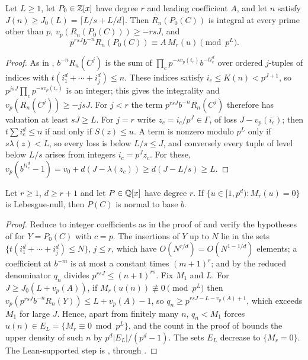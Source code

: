 \documentclass[11pt]{article}
\begin{document}
\begin{lemma}\label{lem:freezer}
Let $L\ge1$, let $P_0\in\mathbb Z[x]$ have degree $r$ and leading coefficient $A$, and let $n$ satisfy
$J(n)\ge J_0(L)=\lceil L/s+L/d\rceil$. Then $R_n(P_0(C))$ is integral at every prime other than $p$,
$v_p(R_n(P_0(C)))\ge-rsJ$, and
\[
p^{rsJ}b^{-n}R_n(P_0(C))\equiv A\,M_r(u)\pmod{p^L}.
\]
\end{lemma}

\begin{proof}
As in , $b^{-n}R_n(C^j)$ is the sum of $\prod_cp^{-sv_p(i_c)}b^{-ti_c^d}$ over ordered
$j$-tuples of indices with $t(i_1^d+\cdots+i_j^d)\le n$. These indices satisfy $i_c\le K(n)<p^{J+1}$, so
$p^{jsJ}\prod_cp^{-sv_p(i_c)}$ is an integer; this gives the integrality and $v_p(R_n(C^j))\ge-jsJ$. For
$j<r$ the term $p^{rsJ}b^{-n}R_n(C^j)$ therefore has valuation at least $sJ\ge L$. For $j=r$ write
$z_c=i_c/p^J\in\Gamma$, of loss $J-v_p(i_c)$; then $t\sum i_c^d\le n$ if and only if $S(z)\le u$. A term
is nonzero modulo $p^L$ only if $s\lambda(z)<L$, so every loss is below $L/s\le J$, and conversely every
tuple of level below $L/s$ arises from integers $i_c=p^Jz_c$. For these,
$v_p(b^{ti_c^d}-1)=v_0+d(J-\lambda(z_c))\ge d(J-L/s)\ge L$.
\end{proof}

\begin{lemma}\label{lem:reductionr}
Let $r\ge1$, $d\ge r+1$ and let $P\in\mathbb Q[x]$ have degree $r$. If $\{u\in[1,p^d):M_r(u)=0\}$ is
Lebesgue-null, then $P(C)$ is normal to base $b$.
\end{lemma}

\begin{proof}
Reduce to integer coefficients as in the proof of  and verify the hypotheses of
 for $Y=P_0(C)$ with $c=p$. The insertions of $Y$ up to $N$ lie in the sets
$\{t(i_1^d+\cdots+i_j^d)\le N\}$, $j\le r$, which have $O(N^{r/d})=O(N^{1-1/d})$ elements; a coefficient at
$b^{-m}$ is at most a constant times $(m+1)^r$; and by  the reduced denominator $q_n$
divides $p^{rsJ}\le(n+1)^{rs}$. Fix $M_1$ and $L$. For $J\ge J_0(L+v_p(A))$, if
$M_r(u(n))\not\equiv0\pmod{p^L}$ then $v_p(p^{rsJ}b^{-n}R_n(Y))\le L+v_p(A)-1$, so $q_n\ge p^{rsJ-L-v_p(A)+1}$,
which exceeds $M_1$ for large $J$. Hence, apart from finitely many $n$, $q_n<M_1$ forces
$u(n)\in E_L=\{M_r\equiv0\bmod p^L\}$, and the count in the proof of  bounds the upper
density of such $n$ by $p^d|E_L|/(p^d-1)$. The sets $E_L$ decrease to $\{M_r=0\}$. The Lean-supported
step is , through .
\end{proof}
\end{document}
